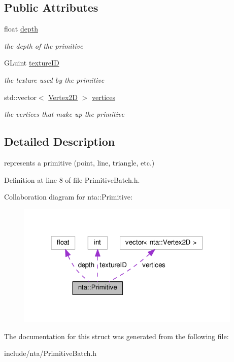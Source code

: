 \subsection*{Public Attributes}
\begin{DoxyCompactItemize}
\item 
\mbox{\label{structnta_1_1Primitive_a4443e427fb512898693bba61a8ac4654}} 
float \hyperlink{structnta_1_1Primitive_a4443e427fb512898693bba61a8ac4654}{depth}
\begin{DoxyCompactList}\small\item\em the depth of the primitive \end{DoxyCompactList}\item 
\mbox{\label{structnta_1_1Primitive_a203f519bb8fefeaae5253ef3739b7701}} 
G\+Luint \hyperlink{structnta_1_1Primitive_a203f519bb8fefeaae5253ef3739b7701}{texture\+ID}
\begin{DoxyCompactList}\small\item\em the texture used by the primitive \end{DoxyCompactList}\item 
\mbox{\label{structnta_1_1Primitive_a4fbc49e3dcd593551b6e65e59d842687}} 
std\+::vector$<$ \hyperlink{structnta_1_1Vertex2D}{Vertex2D} $>$ \hyperlink{structnta_1_1Primitive_a4fbc49e3dcd593551b6e65e59d842687}{vertices}
\begin{DoxyCompactList}\small\item\em the vertices that make up the primitive \end{DoxyCompactList}\end{DoxyCompactItemize}


\subsection{Detailed Description}
represents a primitive (point, line, triangle, etc.) 

Definition at line 8 of file Primitive\+Batch.\+h.



Collaboration diagram for nta\+:\+:Primitive\+:
\nopagebreak
\begin{figure}[H]
\begin{center}
\leavevmode
\includegraphics[width=304pt]{d3/d08/structnta_1_1Primitive__coll__graph}
\end{center}
\end{figure}


The documentation for this struct was generated from the following file\+:\begin{DoxyCompactItemize}
\item 
include/nta/Primitive\+Batch.\+h\end{DoxyCompactItemize}
